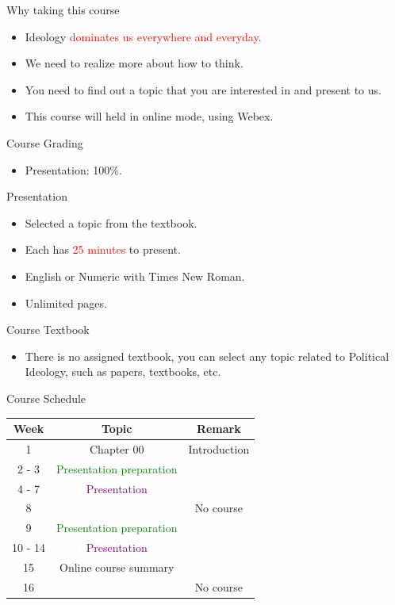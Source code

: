 \documentclass{beamer}
\begin{document}
\begin{frame}{Why taking this course}
\begin{itemize}
\item Ideology \textcolor{red}{dominates us everywhere and everyday}.
\item We need to realize more about how to think.
\item You need to find out a topic that you are interested in and present to us.
\item This course will held in online mode, using Webex.
\end{itemize}
\end{frame}
\begin{frame}{Course Grading}
\begin{itemize}
\item Presentation: 100\%.
\end{itemize}
\end{frame}
\begin{frame}{Presentation}
\begin{itemize}
\item Selected a topic from the textbook.
\item Each has \textcolor{red}{25 minutes} to present.
\item English or Numeric with Times New Roman.
\item Unlimited pages.
\end{itemize}
\end{frame}
\begin{frame}{Course Textbook}
\begin{itemize}
\item There is no assigned textbook, you can select any topic related to Political Ideology, such as papers, textbooks, etc. \\
\end{itemize}
\end{frame}
\begin{frame}{Course Schedule}
\begin{center}
\begin{tabular}{|c|c|c|}
\hline
Week & Topic & Remark \\
\hline
1 & Chapter 00 & Introduction\\
\hline
2 - 3 & \textcolor{Green}{Presentation preparation} & \\
\hline
4 - 7 & \textcolor{purple}{Presentation} & \\
\hline
8 & & No course \\
\hline
9 & \textcolor{Green}{Presentation preparation} & \\
\hline
10 - 14 & \textcolor{purple}{Presentation} & \\
\hline
15 & Online course summary & \\
\hline
16 & & No course \\
\hline
\end{tabular}
\end{center}
\end{frame}
\end{document}
